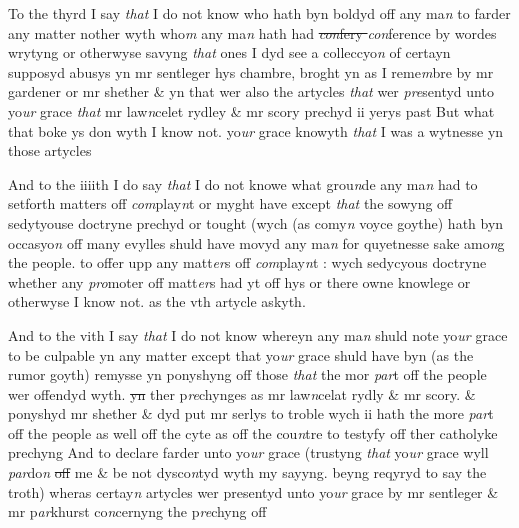 \documentclass[12pt, a4paper]{book}
\begin{document}
		\ifthenelse{\isodd{\thepage}}
		{\reversemarginpar}
		{\normalmarginpar}
		To the thyrd I say \textit{that} I do not know who hath byn boldyd off any ma\textit{n} to 
farder any matter nother wyth who\textit{m} any ma\textit{n} hath had \textit{}
               \sout{
                  \textit{con}fery \textit{}
               }
               \textit{con}ference by wordes
wrytyng or otherwyse savyng \textit{that} ones I dyd see a colleccyo\textit{n} of certayn supposyd
abusys yn mr sentleger hys chambre, broght yn as I reme\textit{m}bre by mr gardener
or mr shether \& yn that wer also the artycles \textit{that} wer \textit{pre}sentyd unto yo\textit{ur }grace 
\textit{that} mr law\textit{n}celet rydley \& mr scory prechyd ii yerys past But what that boke
ys don wyth I know not. yo\textit{ur} grace knowyth \textit{that} I was a wytnesse yn those artycles

            		
				\marginpar[\vspace{0.5cm}{\textcolor{Gray}{4}}]{}
			

		\ifthenelse{\isodd{\thepage}}
		{\reversemarginpar}
		{\normalmarginpar}
		 And to the iiiith I do say \textit{that} I do not knowe what grou\textit{n}de any ma\textit{n} had to setforth
matters off \textit{com}play\textit{n}t or myght have 
			except \textit{that} the sowyng off sedytyouse doctryne
prechyd or tought (wych (as comy\textit{n} voyce goythe) hath byn occasyo\textit{n} off many evylles
shuld have movyd any ma\textit{n} for quyetnesse sake amo\textit{n}g the people. to offer
upp any matt\textit{er}s off \textit{com}play\textit{n}t : wych sedycyous doctryne whether any \textit{pro}moter
off matt\textit{er}s had yt off hys or
			 there owne knowlege or otherwyse I know not. as the 
vth artycle askyth. 

            		
				\marginpar[\vspace{0.5cm}{\textcolor{Gray}{6}}]{}
			

		\ifthenelse{\isodd{\thepage}}
		{\reversemarginpar}
		{\normalmarginpar}
		 And to the vith I say \textit{that} I do not know whereyn any ma\textit{n} shuld note yo\textit{ur} grace to be
culpable yn any matter except that yo\textit{ur} grace shuld have byn (as the rumor goyth)
remysse yn ponyshyng off those \textit{that} the mor \textit{par}t off the people wer offendyd wyth.
\sout{yn }ther p\textit{re}chynges as mr law\textit{n}celat rydly \& mr scory. \& ponyshyd mr shether \& dyd
			 put 
mr serlys to troble wych ii hath the more \textit{par}t off the people as well off the 
cyte as off the cou\textit{n}tre to testyfy off ther catholyke prechyng And to declare
farder unto yo\textit{ur} grace (trustyng \textit{that} yo\textit{ur} grace wyll \textit{par}do\textit{n}
               \sout{off} me \& be not dysco\textit{n}tyd wyth
my sayyng. beyng reqyryd to say the troth) wheras certay\textit{n} artycles wer
presentyd unto yo\textit{ur} grace by mr sentleger \& mr p\textit{ar}khurst co\textit{n}cernyng the p\textit{re}chyng off
\end{document}
